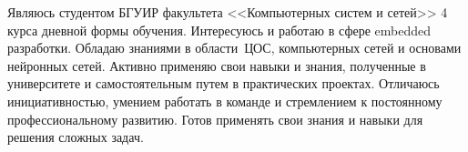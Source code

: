 

\begin{cvparagraph}

Являюсь студентом БГУИР факультета <<Компьютерных систем и сетей>> 4 курса дневной формы обучения. 
Интересуюсь и работаю в сфере embedded разработки. 
Обладаю знаниями в области~ЦОС, компьютерных сетей и основами нейронных сетей.
Активно применяю свои навыки и знания, полученные в университете и самостоятельным путем
в практических проектах. Отличаюсь инициативностью, умением работать в команде и стремлением к 
постоянному профессиональному развитию. Готов применять свои знания и навыки для решения сложных задач.

\end{cvparagraph}
